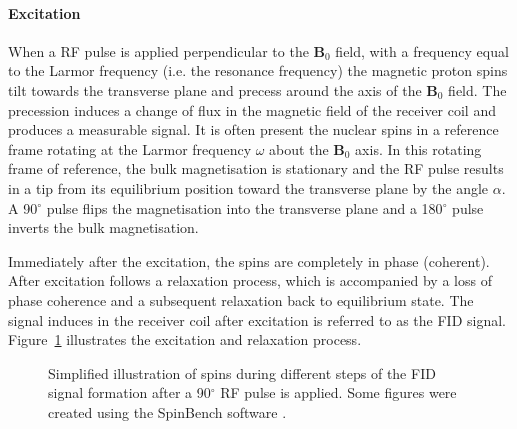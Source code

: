 \paragraph{Excitation}
When a \gls{RF} pulse is applied perpendicular to the $\mathbf{B}_0$ field, with a frequency equal to the Larmor frequency (i.e. the resonance frequency) the magnetic proton spins tilt towards the transverse plane and precess around the axis of the $\mathbf{B}_0$ field. The precession induces a change of flux in the magnetic field of the receiver coil and produces a measurable signal. It is often present the nuclear spins in a reference frame rotating at the Larmor frequency $\omega$ about the $\mathbf{B}_0$ axis. In this rotating frame of reference, the bulk magnetisation is stationary and the \gls{RF} pulse results in a tip from its equilibrium position toward the transverse plane by the angle $\alpha$. A 90$^\circ$ pulse flips the magnetisation into the transverse plane and a 180$^\circ$ pulse inverts the bulk magnetisation.

Immediately after the excitation, the spins are completely in phase (coherent). After excitation follows a relaxation process, which is accompanied by a loss of phase coherence and a subsequent relaxation back to equilibrium state. The signal induces in the receiver coil after excitation is referred to as the \gls{FID} signal. Figure~\ref{fig:chapter2 spin FIDs} illustrates the excitation and relaxation process. 

\begin{figure}[H]
\centering
{}
\caption{Simplified illustration of spins during different steps of the FID signal formation after a 90$^\circ$ RF pulse is applied. Some figures were created using the SpinBench software \citep{Overall:2007}.}
\label{fig:chapter2 spin FIDs}
\end{figure}

